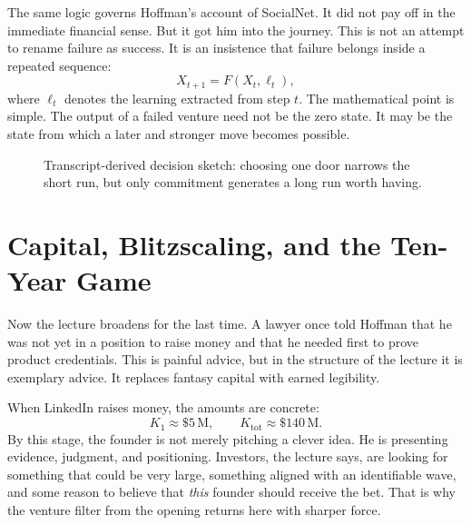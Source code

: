 The same logic governs Hoffman's account of SocialNet. It did not pay off in the immediate financial sense. But it got him into the journey. This is not an attempt to rename failure as success. It is an insistence that failure belongs inside a repeated sequence:
\begin{equation}
X_{t+1}=F(X_t,\ell_t),
\end{equation}
where \(\ell_t\) denotes the learning extracted from step \(t\). The mathematical point is simple. The output of a failed venture need not be the zero state. It may be the state from which a later and stronger move becomes possible.

\begin{figure}
\begin{center}

{\small Transcript-derived decision sketch: choosing one door narrows the short run, but only commitment generates a long run worth having.}
\end{center}
\end{figure}

\section{Capital, Blitzscaling, and the Ten-Year Game}

Now the lecture broadens for the last time. A lawyer once told Hoffman that he was not yet in a position to raise money and that he needed first to prove product credentials. This is painful advice, but in the structure of the lecture it is exemplary advice. It replaces fantasy capital with earned legibility.

When LinkedIn raises money, the amounts are concrete:
\begin{equation}
K_1 \approx \$5\,\mathrm{M}, \qquad K_{\mathrm{tot}} \approx \$140\,\mathrm{M}.
\end{equation}
By this stage, the founder is not merely pitching a clever idea. He is presenting evidence, judgment, and positioning. Investors, the lecture says, are looking for something that could be very large, something aligned with an identifiable wave, and some reason to believe that \emph{this} founder should receive the bet. That is why the venture filter from the opening returns here with sharper force.

